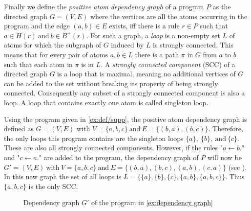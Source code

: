 Finally we define the \emph{positive atom dependency graph} of a program $P$ as the directed graph \(G = (V, E)\) where the vertices are all the atoms occurring in the program and the edge \((a,b) \in E\) exists, iff there is a rule \(r \in P\) such that \(a \in H(r) \ \text{and}\ b \in B^+(r)\).
For such a graph, a \emph{loop} is a non-empty set $L$ of atoms for which the subgraph of $G$ induced by $L$ is strongly connected. This means that for every pair of atoms \(a,b \in L\) there is a path $\pi$ in $G$ from $a$ to $b$ such that each atom in $\pi$ is in $L$.
A \emph{strongly connected component} (SCC) of a directed graph $G$ is a loop that is maximal, meaning no additional vertices of $G$ can be added to the set without breaking its property of being strongly connected. Consequently any subset of a strongly connected component is also a loop.
A loop that contains exactly one atom is called singleton loop.
\begin{example}
\label{ex:dependency graph}
    Using the program given in \cref{ex:def/supp}, the positive atom dependency graph is defined as \(G = (V, E)\) with \(V = \{a, b, c\}\ \text{and}\ E = \{(b, a), (b, c)\}\). Therefore, the only loops this program contains are the singleton loops \(\{a\},\ \{b\},\ \text{and}\ \{c\}\). These are also all strongly connected components. 
    However, if the rules "\(a \leftarrow b.\)" and "\(c \leftarrow a.\)" are added to the program, the dependency graph of $P$ will now be \(G' = (V, E)\ \text{with}\ V = \{a,b,c\}\ \text{and}\ E = \{(b,a), (b,c), (a,b), (c,a)\}\) (see ). In this new graph the set of all loops is \(L = \{\{a\},\{b\},\{c\},\{a,b\},\{a,b,c\}\}\). Thus \(\{a, b, c\}\) is the only SCC.
\end{example}

\begin{figure}[h]
    \centering
    \caption{Dependency graph $G'$ of the program in \cref{ex:dependency graph}}
    \label{fig:dependency graph}
\end{figure}


\begin{comment}
- Basic introduction to asp giving all the relevant definitions (with examples + sources (for all/some?)) 
    
    -  is  Herbrand Universe/Base needed? -> not really but should it be taken out?

-> adjust these so they work for variables etc. or do this later? (is this needed?/ is it a big adjustment?)
\end{comment}


